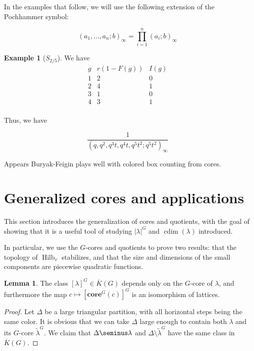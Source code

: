 \documentclass{amsart}[12pt]
\theoremstyle{definition}
\newtheorem{lemma}[dummy]{Lemma}
\newtheorem{example}[dummy]{Example}
\newcommand{\core}{\mathbf{core}}
\DeclareMathOperator{\Hilb}{Hilb}
\DeclareMathOperator{\cdim}{cdim}
\begin{document}
In the examples that follow, we will use the following extension of the Pochhammer symbol:

$$(a_1,\dots, a_n; b)_\infty=\prod_{i=1}^n (a_i;b)_\infty$$

\begin{example}[$S_{2/5}$]
We have
$$\begin{array}{r|c|l}
g & r(1-F(g)) & I(g) \\
\hline
1 & 2 & 0 \\
2 & 4 & 1 \\
3 & 1 & 0 \\
4 & 3 & 1 \\
\end{array}
$$

Thus, we have


$$
\frac{1}{(q, q^2,q^3t, q^4t, q^5t^2; q^5t^2)_\infty}
$$
\end{example}


Appears Buryak-Feigin plays well with colored box counting from cores.



\section{Generalized cores and applications}

This section introduces the generalization of cores and quotients, with the goal of showing that it is a useful tool of studying $|\lambda|^G$ and $\cdim(\lambda)$ introduced.

In particular, we use the $G$-cores and quotients to prove two results: that the topology of $\Hilb_v$ stabilizes, and that the size and dimensions of the small components are piecewise quadratic functions.

\begin{lemma}
The class $[\lambda]^G\in\overline{K}(G)$ depends only on the $G$-core of $\lambda$, and furthermore the map $c\mapsto [\core^G(c)]^G$ is an isomorphism of lattices.
\end{lemma}

\begin{proof}
Let $\Delta$ be a large triangular partition, with all horizontal steps being the same color.  It is obvious that we can take $\Delta$ large enough to contain both $\lambda$ and its $G$-core $\tilde{\lambda}^G$.  We claim that $\Delta\seminus\lambda$ and $\Delta\setminus\tilde{\lambda}^G$ have the same class in $\overline{K}(G)$.  

\end{proof}
\end{document}
